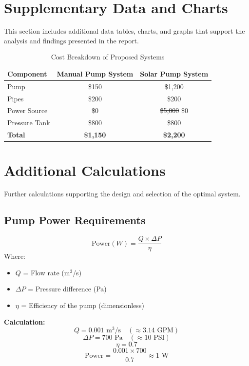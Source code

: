 \documentclass[12pt]{report}
\begin{document}
    \section{Supplementary Data and Charts}
    This section includes additional data tables, charts, and graphs that support the analysis and findings presented in the report.
    \begin{table}[h!]
        \centering
        \caption{Cost Breakdown of Proposed Systems}
        \begin{tabular}{|l|c|c|}
            \hline
            \textbf{Component} & \textbf{Manual Pump System} & \textbf{Solar Pump System} \\ \hline
            Pump & \$150 & \$1,200 \\ \hline
            Pipes & \$200 & \$200 \\ \hline
            Power Source & \$0 & \sout{\$5,000} \$0 \\ \hline
            Pressure Tank & \$800 & \$800 \\ \hline
            \textbf{Total} & \textbf{\$1,150} & \textbf{\$2,200} \\ \hline
        \end{tabular}
        \label{tab:cost_breakdown}
    \end{table}
    
    
    \section{Additional Calculations}
    Further calculations supporting the design and selection of the optimal system.

    \subsection{Pump Power Requirements}
    \[
    \text{Power} (W) = \frac{Q \times \Delta P}{\eta}
    \]
    Where:
    \begin{itemize}
        \item \( Q \) = Flow rate (m\(^3\)/s)
        \item \( \Delta P \) = Pressure difference (Pa)
        \item \( \eta \) = Efficiency of the pump (dimensionless)
    \end{itemize}
    
    \textbf{ Calculation:}
    \[
    Q = 0.001 \text{ m}^3/\text{s} \quad (\approx 3.14 \text{ GPM})
    \]
    \[
    \Delta P = 700 \text{ Pa} \quad (\approx 10 \text{ PSI})
    \]
    \[
    \eta = 0.7
    \]
    \[
    \text{Power} = \frac{0.001 \times 700}{0.7} \approx 1 \text{ W}
    \]
    
\end{document}
